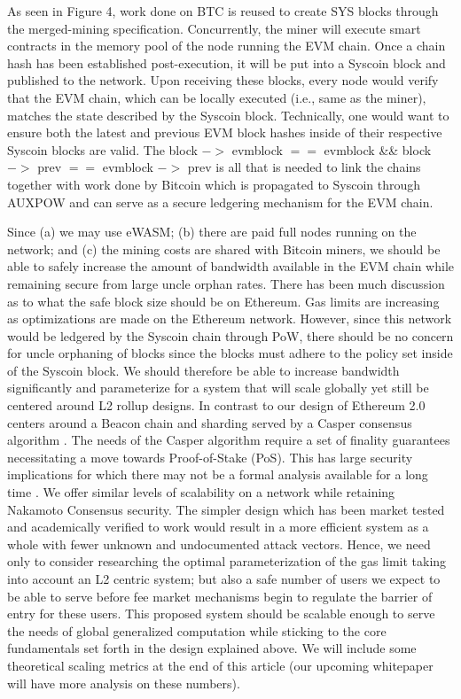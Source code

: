 \documentclass[peerreview]{ieeesyscoin}
\begin{document}
As seen in Figure 4, work done on BTC is reused to create SYS blocks through the merged-mining specification. Concurrently, the miner will execute smart contracts in the memory pool of the node running the EVM chain. Once a chain hash has been established post-execution, it will be put into a Syscoin block and published to the network. Upon receiving these blocks, every node would verify that the EVM chain, which can be locally executed (i.e., same as the miner), matches the state described by the Syscoin block. Technically, one would want to ensure both the latest and previous EVM block hashes inside of their respective Syscoin blocks are valid. The block $->$ evmblock $==$ evmblock \&\& block $->$ prev $==$ evmblock $->$ prev is all that is needed to link the chains together with work done by Bitcoin which is propagated to Syscoin through AUXPOW and can serve as a secure ledgering mechanism for the EVM chain.

Since (a) we may use eWASM; (b) there are paid full nodes running on the network; and (c) the mining costs are shared with Bitcoin miners, we should be able to safely increase the amount of bandwidth available in the EVM chain while remaining secure from large uncle orphan rates. There has been much discussion as to what the safe block size should be on Ethereum. Gas limits are increasing as optimizations are made on the Ethereum network. However, since this network would be ledgered by the Syscoin chain through PoW, there should be no concern for uncle orphaning of blocks since the blocks must adhere to the policy set inside of the Syscoin block. We should therefore be able to increase bandwidth significantly and parameterize for a system that will scale globally yet still be centered around L2 rollup designs. In contrast to our design of Ethereum 2.0 centers around a Beacon chain and sharding served by a Casper consensus algorithm \cite{But17}. The needs of the Casper algorithm require a set of finality guarantees necessitating a move towards Proof-of-Stake (PoS). This has large security implications for which there may not be a formal analysis available for a long time \cite{Neu21}.  We offer similar levels of scalability on a network while retaining Nakamoto Consensus security. The simpler design which has been market tested and academically verified to work would result in a more efficient system as a whole with fewer unknown and undocumented attack vectors. Hence, we need only to consider researching the optimal parameterization of the gas limit taking into account an L2 centric system; but also a safe number of users we expect to be able to serve before fee market mechanisms begin to regulate the barrier of entry for these users. This proposed system should be scalable enough to serve the needs of global generalized computation while sticking to the core fundamentals set forth in the design explained above.  We will include some theoretical scaling metrics at the end of this article (our upcoming whitepaper will have more analysis on these numbers).
\end{document}
